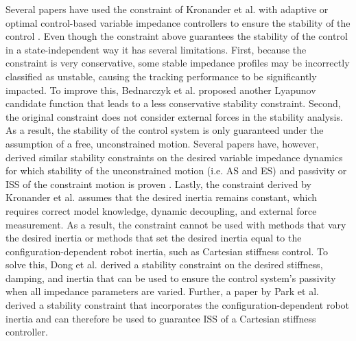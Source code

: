 Several papers have used the constraint of Kronander et al. \cite{kronanderStabilityConsiderationsVariable2016} with adaptive or optimal control-based variable impedance controllers to ensure the stability of the control \cite{fontanelliComparisonAssistiveMethods2018,liuAdaptiveEnhancedAdmittance2022,liangAdaptiveTimeVaryingImpedance2022,heVariableImpedanceControl2020,dongAdaptiveStiffnessDamping2019}. Even though the constraint above guarantees the stability of the control in a state-independent way it has several limitations. First, because the constraint is very conservative, some stable impedance profiles may be incorrectly classified as unstable, causing the tracking performance to be significantly impacted. To improve this, Bednarczyk et al. \cite{bednarczykPassivityFilterVariable2020} proposed another Lyapunov candidate function that leads to a less conservative stability constraint. Second, the original constraint does not consider external forces in the stability analysis. As a result, the stability of the control system is only guaranteed under the assumption of a free, unconstrained motion. Several papers have, however, derived similar stability constraints on the desired variable impedance dynamics for which stability of the unconstrained motion (i.e. AS and ES) and passivity or ISS of the constraint motion is proven
\cite{parkInputtoStateStabilityVariable2020,sunStabilityGuaranteedVariableImpedance2021,zhangNeuralApproximationbasedAdaptive2020,bednarczykPassivityFilterVariable2020}. Lastly, the constraint derived by Kronander et al. \cite{kronanderStabilityConsiderationsVariable2016} assumes that the desired inertia remains constant, which requires correct model knowledge, dynamic decoupling, and external force measurement. As a result, the constraint cannot be used with methods that vary the desired inertia or methods that set the desired inertia equal to the configuration-dependent robot inertia, such as Cartesian stiffness control. To solve this, Dong et al. \cite{dongUDEBasedVariableImpedance2019} derived a stability constraint on the desired stiffness, damping, and inertia that can be used to ensure the control system's passivity when all impedance parameters are varied. Further, a paper by Park et al. \cite{parkInputtoStateStabilityVariable2020} derived a stability constraint that incorporates the configuration-dependent robot inertia and can therefore be used to guarantee ISS of a Cartesian stiffness controller.
